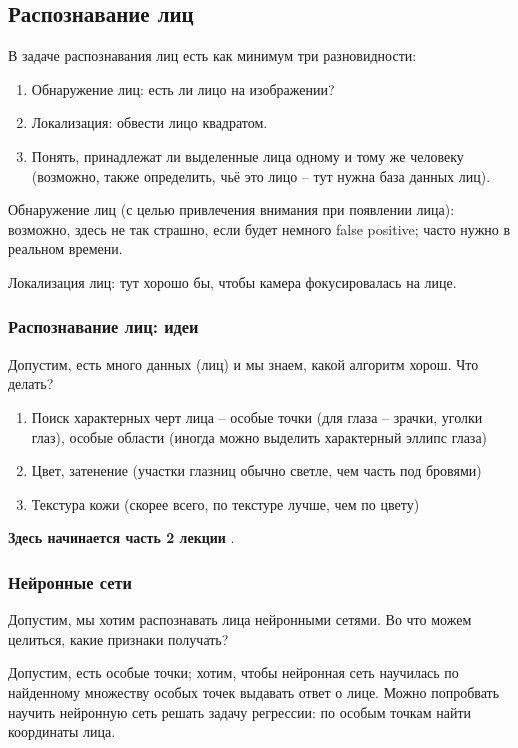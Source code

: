 \documentclass[main.tex]{subfiles}
\begin{document}
\subsection{Распознавание лиц}
В задаче распознавания лиц есть как минимум три разновидности:

\begin{enumerate}[noitemsep]
	\item Обнаружение лиц: есть ли лицо на изображении?
	\item Локализация: обвести лицо квадратом.
	\item Понять, принадлежат ли выделенные лица одному и тому же человеку (возможно, также определить, чьё это лицо -- тут нужна база данных лиц).
\end{enumerate}

Обнаружение лиц (с целью привлечения внимания при появлении лица): возможно, здесь не так страшно, если будет немного false positive; часто нужно в реальном времени.

Локализация лиц: тут хорошо бы, чтобы камера фокусировалась на лице.

\subsubsection{Распознавание лиц: идеи}

Допустим, есть много данных (лиц) и мы знаем, какой алгоритм хорош.
Что делать?

\begin{enumerate}[noitemsep]
	\item Поиск характерных черт лица -- особые точки (для глаза -- зрачки, уголки глаз), особые области (иногда можно выделить характерный эллипс глаза)
	\item Цвет, затенение (участки глазниц обычно светле, чем часть под бровями)
	\item Текстура кожи (скорее всего, по текстуре лучше, чем по цвету)
\end{enumerate}

\textbf{ Здесь начинается часть 2 лекции }.

\subsubsection{Нейронные сети}

Допустим, мы хотим распознавать лица нейронными сетями.
Во что можем целиться, какие признаки получать?

Допустим, есть особые точки; хотим, чтобы нейронная сеть научилась по найденному множеству особых точек выдавать ответ о лице.
Можно попробвать научить нейронную сеть решать задачу регрессии: по особым точкам найти координаты лица.
\end{document}
